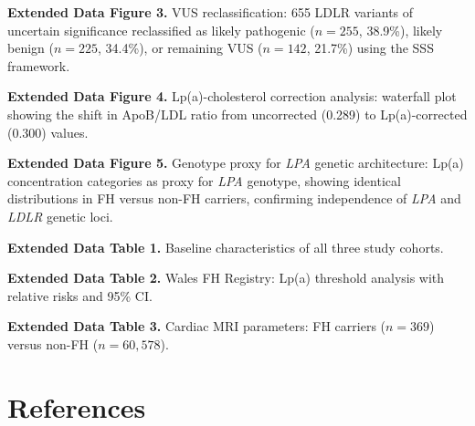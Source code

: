 \documentclass[11pt,a4paper]{article}
\begin{document}
\textbf{Extended Data Figure 3.} VUS reclassification: 655 LDLR variants of uncertain significance reclassified as likely pathogenic ($n = 255$, 38.9\%), likely benign ($n = 225$, 34.4\%), or remaining VUS ($n = 142$, 21.7\%) using the SSS framework.

\textbf{Extended Data Figure 4.} Lp(a)-cholesterol correction analysis: waterfall plot showing the shift in ApoB/LDL ratio from uncorrected (0.289) to Lp(a)-corrected (0.300) values.

\textbf{Extended Data Figure 5.} Genotype proxy for \textit{LPA} genetic architecture: Lp(a) concentration categories as proxy for \textit{LPA} genotype, showing identical distributions in FH versus non-FH carriers, confirming independence of \textit{LPA} and \textit{LDLR} genetic loci.

\textbf{Extended Data Table 1.} Baseline characteristics of all three study cohorts.

\textbf{Extended Data Table 2.} Wales FH Registry: Lp(a) threshold analysis with relative risks and 95\% CI.

\textbf{Extended Data Table 3.} Cardiac MRI parameters: FH carriers ($n = 369$) versus non-FH ($n = 60{,}578$).

\clearpage
\section*{References}
\end{document}
